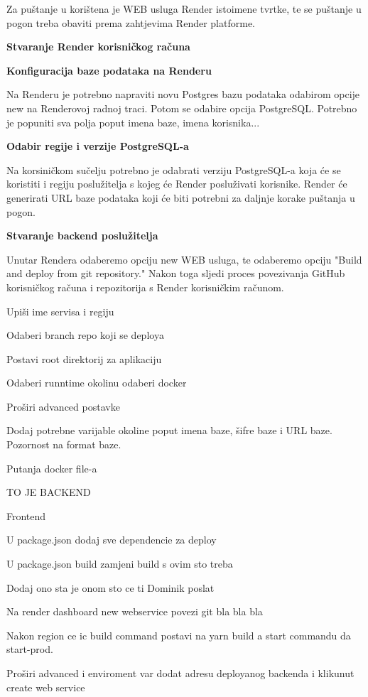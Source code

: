 			Za puštanje u korištena je WEB usluga Render istoimene tvrtke, te se puštanje u pogon treba obaviti prema zahtjevima Render platforme. 
			 	
			 \textbf{Stvaranje Render korisničkog računa}
			 	
			 \textbf{Konfiguracija baze podataka na Renderu}
			 
			 Na Renderu je potrebno napraviti novu Postgres bazu podataka odabirom opcije new na Renderovoj radnoj traci. Potom se odabire opcija PostgreSQL. Potrebno je popuniti sva polja poput imena baze, imena korisnika...
			 
			 \textbf{Odabir regije i verzije PostgreSQL-a}
			 
			 Na korsiničkom sučelju potrebno je odabrati verziju PostgreSQL-a koja će se koristiti i regiju poslužitelja s kojeg će Render posluživati korisnike. Render će generirati URL baze podataka koji će biti potrebni za daljnje korake puštanja u pogon.
			 
			 \textbf{Stvaranje backend poslužitelja}
			 
			 Unutar Rendera odaberemo opciju new WEB usluga, te odaberemo opciju "Build and deploy from git repository." Nakon toga sljedi proces povezivanja GitHub korisničkog računa i repozitorija s Render korisničkim računom.
			 
			 Upiši ime servisa i regiju
			 
			 Odaberi branch repo koji se deploya
			 
			 Postavi root direktorij za aplikaciju
			 
			 Odaberi runntime okolinu odaberi docker 
			 
			 Proširi advanced postavke 
			 
			 Dodaj potrebne varijable okoline poput imena baze, šifre baze i URL baze. Pozornost na format baze.
			 
			 Putanja docker file-a
			 
			 TO JE BACKEND
			 
			 Frontend 
			 
			 U package.json dodaj sve dependencie za deploy
			 
			 U package.json build zamjeni build s ovim sto treba
			 
			 Dodaj ono sta je onom sto ce ti Dominik poslat
			 
			 Na render dashboard new webservice povezi git bla bla bla
			 
			 Nakon region ce ic build command postavi na yarn build a start commandu da start-prod. 
			 
			 Proširi advanced i enviroment var dodat adresu deployanog backenda i klikunut create web service
			 
			 
			 
			 
			 	
			 		
			
			
			\eject 